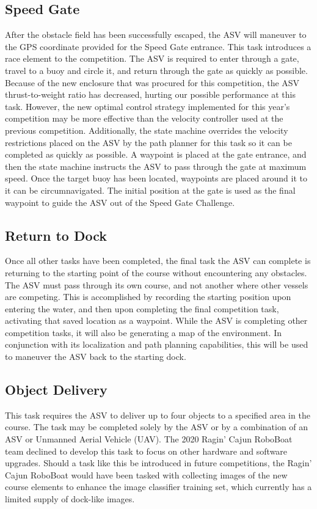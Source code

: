 \documentclass[letterpaper, 12 pt, conference]{ieeeconf}
\begin{document}
\subsection{Speed Gate}
\label{SpeedGate}
After the obstacle field has been successfully escaped, the ASV will maneuver to the GPS coordinate provided for the Speed Gate entrance. This task introduces a race element to the competition. The ASV is required to enter through a gate, travel to a buoy and circle it, and return through the gate as quickly as possible. Because of the new enclosure that was procured for this competition, the ASV thrust-to-weight ratio has decreased, hurting our possible performance at this task. However, the new optimal control strategy implemented for this year's competition may be more effective than the velocity controller used at the previous competition. Additionally, the state machine overrides the velocity restrictions placed on the ASV by the path planner for this task so it can be completed as quickly as possible. A waypoint is placed at the gate entrance, and then the state machine instructs the ASV to pass through the gate at maximum speed. Once the target buoy has been located, waypoints are placed around it to it can be circumnavigated. The initial position at the gate is used as the final waypoint to guide the ASV out of the Speed Gate Challenge.

\subsection{Return to Dock}
\label{ReturnToDock}
Once all other tasks have been completed, the final task the ASV can complete is returning to the starting point of the course without encountering any obstacles. The ASV must pass through its own course, and not another where other vessels are competing. This is accomplished by recording the starting position upon entering the water, and then upon completing the final competition task, activating that saved location as a waypoint. While the ASV is completing other competition tasks, it will also be generating a map of the environment. In conjunction with its localization and path planning capabilities, this will be used to maneuver the ASV back to the starting dock.

\subsection{Object Delivery}
\label{ObjectDelivery}
This task requires the ASV to deliver up to four objects to a specified area in the course. The task may be completed solely by the ASV or by a combination of an ASV or Unmanned Aerial Vehicle (UAV). The 2020 Ragin' Cajun RoboBoat team declined to develop this task to focus on other hardware and software upgrades. Should a task like this be introduced in future competitions, the Ragin' Cajun RoboBoat would have been tasked with collecting images of the new course elements to enhance the image classifier training set, which currently has a limited supply of dock-like images.
\end{document}
